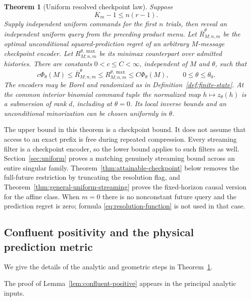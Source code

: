 \documentclass[11pt]{amsart}
\newtheorem{theorem}{Theorem}[section]
\theoremstyle{definition}\newtheorem{definition}[theorem]{Definition}
\theoremstyle{remark}\newtheorem{remark}[theorem]{Remark}
\begin{document}
\begin{theorem}[Uniform resolved checkpoint law]\label{thm:confluent-law}
Suppose
\begin{equation}\label{eq:full-future-condition}
 K_m-1\le n(r-1).
\end{equation}
Supply independent uniform commands for the first $n$ trials, then reveal
an independent uniform query from the preceding product menu. Let
$\overline R_{M;n,m}^\theta$ be the optimal unconditional squared-prediction
regret of an arbitrary $M$-message checkpoint encoder. Let
$R_{M;n,m}^{\theta,\max}$ be its minimax counterpart over admitted histories.
There are constants $0<c\le C<\infty$, independent of $M$ and $\theta$,
such that
\begin{equation}\label{eq:confluent-law}
 c\Phi_\theta(M)\le\overline R_{M;n,m}^\theta
       \le R_{M;n,m}^{\theta,\max}\le C\Phi_\theta(M),
 \qquad 0\le\theta\le\theta_0.
\end{equation}
The encoders may be Borel and randomized as in
Definition~\ref{def:finite-state}. At the common interior binomial command
tuple the normalized map $h\mapsto z_\theta(h)$ is a submersion of rank
$d$, including at $\theta=0$. Its local inverse bounds and an unconditional
minorization can be chosen uniformly in $\theta$.
\end{theorem}

The upper bound in this theorem is a checkpoint bound. It does not assume
that access to an exact prefix is free during repeated compression. Every
streaming filter is a checkpoint encoder, so the lower bound applies to
such filters as well. Section~\ref{sec:uniform} proves a matching genuinely
streaming bound across an entire singular family. Theorem~\ref{thm:attainable-checkpoint}
below removes the full-future restriction by truncating the resolution flag,
and Theorem~\ref{thm:general-uniform-streaming} proves the fixed-horizon
causal version for the affine class. When $m=0$ there is no nonconstant
future query and the prediction regret is zero; formula
\eqref{eq:resolution-function} is not used in that case.

\subsection{Confluent positivity and the physical prediction metric}
We give the details of the analytic and geometric steps in
Theorem~\ref{thm:confluent-law}.

The proof of Lemma~\ref{lem:confluent-positive} appears in the principal analytic inputs.
\end{document}
